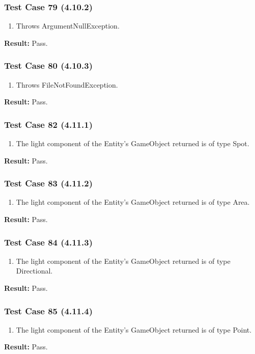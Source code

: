 \documentclass[a4paper,12pt]{article}
\begin{document}
		\subsubsection{Test Case 79 (4.10.2)}
				\begin{enumerate}
					\item Throws ArgumentNullException.
				\end{enumerate}
			\textbf{Result: }Pass.
		\subsubsection{Test Case 80 (4.10.3)}
				\begin{enumerate}
					\item Throws FileNotFoundException.
				\end{enumerate}
			\textbf{Result: }Pass.
		\subsubsection{Test Case 82 (4.11.1)}
				\begin{enumerate}
					\item The light component of the Entity’s GameObject returned is of type Spot.
				\end{enumerate}
			\textbf{Result: }Pass.
		\subsubsection{Test Case 83 (4.11.2)}
				\begin{enumerate}
					\item The light component of the Entity’s GameObject returned is of type Area.
				\end{enumerate}
			\textbf{Result: }Pass.
		\subsubsection{Test Case 84 (4.11.3)}
				\begin{enumerate}
					\item The light component of the Entity’s GameObject returned is of type Directional.
				\end{enumerate}
			\textbf{Result: }Pass.
		\subsubsection{Test Case 85 (4.11.4)}
				\begin{enumerate}
					\item The light component of the Entity’s GameObject returned is of type Point.
				\end{enumerate}
			\textbf{Result: }Pass.
\end{document}

